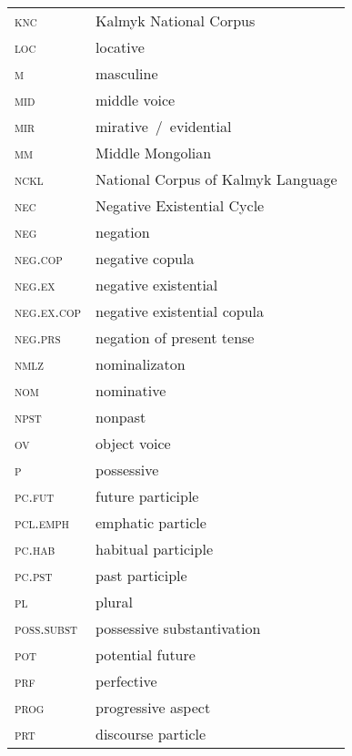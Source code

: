 \documentclass[output=paper]{langsci/langscibook}
\begin{document}
\begin{tabularx}{.45\textwidth}{lQ}
	\textsc{knc} & Kalmyk National Corpus\\
    \textsc{loc} & locative\\
    \textsc{m} & masculine\\
    \textsc{mid} & middle voice\\
    \textsc{mir} & mirative / evidential\\
    \textsc{mm} & Middle Mongolian\\
    \textsc{nckl} & National Corpus of Kalmyk Language\\
    \textsc{nec} & Negative Existential Cycle\\
    \textsc{neg} & negation\\
    \textsc{neg.cop} & negative copula\\
    \textsc{neg.ex} & negative existential\\
    \textsc{neg.ex.cop} & negative existential copula\\
    \textsc{neg.prs} & negation of present tense\\
    \textsc{nmlz} & nominalizaton\\
    \textsc{nom} & nominative\\
    \textsc{npst} & nonpast\\
    \textsc{ov} & object voice\\
    \textsc{p} & possessive\\
    \textsc{pc.fut} & future participle\\
    \textsc{pcl.emph} & emphatic particle\\
    \textsc{pc.hab} & habitual participle\\
    \textsc{pc.pst} & past participle\\
    \textsc{pl} & plural\\
    \textsc{poss.subst} & possessive substantivation\\
    \textsc{pot} & potential future\\
    \textsc{prf} & perfective\\
    \textsc{prog} & progressive aspect\\
    \textsc{prt} & discourse particle\\
\end{tabularx}
\end{document}
